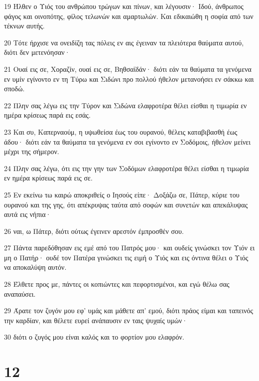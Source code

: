 \par 19 Ήλθεν ο Υιός του ανθρώπου τρώγων και πίνων, και λέγουσιν· Ιδού, άνθρωπος φάγος και οινοπότης, φίλος τελωνών και αμαρτωλών. Και εδικαιώθη η σοφία από των τέκνων αυτής.
\par 20 Τότε ήρχισε να ονειδίζη τας πόλεις εν αις έγειναν τα πλειότερα θαύματα αυτού, διότι δεν μετενόησαν·
\par 21 Ουαί εις σε, Χοραζίν, ουαί εις σε, Βηθσαϊδάν· διότι εάν τα θαύματα τα γενόμενα εν υμίν εγίνοντο εν τη Τύρω και Σιδώνι προ πολλού ήθελον μετανοήσει εν σάκκω και σποδώ.
\par 22 Πλην σας λέγω εις την Τύρον και Σιδώνα ελαφροτέρα θέλει είσθαι η τιμωρία εν ημέρα κρίσεως παρά εις εσάς.
\par 23 Και συ, Καπερναούμ, η υψωθείσα έως του ουρανού, θέλεις καταβιβασθή έως άδου· διότι εάν τα θαύματα τα γενόμενα εν σοι εγίνοντο εν Σοδόμοις, ήθελον μείνει μέχρι της σήμερον.
\par 24 Πλην σας λέγω, ότι εις την γην των Σοδόμων ελαφροτέρα θέλει είσθαι η τιμωρία εν ημέρα κρίσεως παρά εις σε.
\par 25 Εν εκείνω τω καιρώ αποκριθείς ο Ιησούς είπε· Δοξάζω σε, Πάτερ, κύριε του ουρανού και της γης, ότι απέκρυψας ταύτα από σοφών και συνετών και απεκάλυψας αυτά εις νήπια·
\par 26 ναι, ω Πάτερ, διότι ούτως έγεινεν αρεστόν έμπροσθέν σου.
\par 27 Πάντα παρεδόθησαν εις εμέ από του Πατρός μου· και ουδείς γινώσκει τον Υιόν ει μη ο Πατήρ· ουδέ τον Πατέρα γινώσκει τις ειμή ο Υιός και εις όντινα θέλει ο Υιός να αποκαλύψη αυτόν.
\par 28 Έλθετε προς με, πάντες οι κοπιώντες και πεφορτισμένοι, και εγώ θέλω σας αναπαύσει.
\par 29 Άρατε τον ζυγόν μου εφ' υμάς και μάθετε απ' εμού, διότι πράος είμαι και ταπεινός την καρδίαν, και θέλετε ευρεί ανάπαυσιν εν ταις ψυχαίς υμών·
\par 30 διότι ο ζυγός μου είναι καλός και το φορτίον μου ελαφρόν.

\chapter{12}

